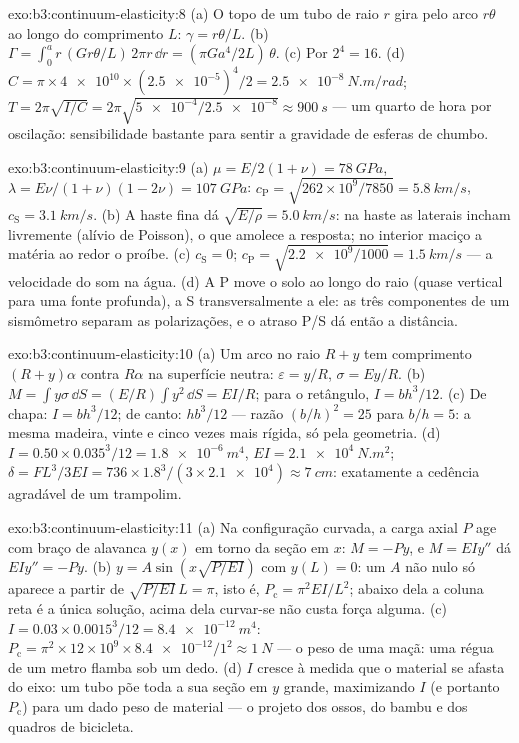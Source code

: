 \begin{solution}{exo:b3:continuum-elasticity:8}
(a) O topo de um tubo de raio $r$ gira pelo arco $r\theta$ ao longo do
comprimento $L$: $\gamma = r\theta/L$. (b) $\Gamma = \int_0^a r\,(G r\theta/L)\,
2\pi r\,\dd r = (\pi Ga^4/2L)\,\theta$. (c) Por $2^4 = 16$. (d) $C =
\pi \times \num{4e10} \times (\num{2.5e-5})^4/2 =
\qty{2.5e-8}{N.m/rad}$; $T = 2\pi\sqrt{I/C} = 2\pi\sqrt{\num{5e-4}/
\num{2.5e-8}} \approx \qty{900}{s}$ --- um quarto de hora por
oscilação: sensibilidade bastante para sentir a gravidade de esferas
de chumbo.
\end{solution}

\begin{solution}{exo:b3:continuum-elasticity:9}
(a) $\mu = E/2(1+\nu) = \qty{78}{GPa}$, $\lambda = E\nu/(1+\nu)(1-2\nu)
= \qty{107}{GPa}$: $c_{\text{P}} = \sqrt{262\times10^9/7850} =
\qty{5.8}{km/s}$, $c_{\text{S}} = \qty{3.1}{km/s}$. (b) A haste fina
dá $\sqrt{E/\rho} = \qty{5.0}{km/s}$: na haste as laterais incham
livremente (alívio de Poisson), o que amolece a resposta; no interior
maciço a matéria ao redor o proíbe. (c) $c_{\text{S}} = 0$;
$c_{\text{P}} = \sqrt{\num{2.2e9}/1000} = \qty{1.5}{km/s}$ --- a
velocidade do som na água. (d) A P move o solo ao longo do raio
(quase vertical para uma fonte profunda), a S transversalmente a ele:
as três componentes de um sismômetro separam as polarizações, e o
atraso P/S dá então a distância.
\end{solution}

\begin{solution}{exo:b3:continuum-elasticity:10}
(a) Um arco no raio $R + y$ tem comprimento $(R + y)\alpha$ contra
$R\alpha$ na superfície neutra: $\varepsilon = y/R$, $\sigma =
Ey/R$. (b) $M = \int y\sigma\,\dd S = (E/R)\int y^2\,\dd S = EI/R$;
para o retângulo, $I = bh^3/12$. (c) De chapa: $I = bh^3/12$; de
canto: $hb^3/12$ --- razão $(b/h)^2 = 25$ para $b/h = 5$: a mesma
madeira, vinte e cinco vezes mais rígida, só pela geometria. (d) $I = 0.50 \times
0.035^3/12 = \qty{1.8e-6}{m^4}$, $EI = \qty{2.1e4}{N.m^2}$; $\delta =
FL^3/3EI = 736 \times 1.8^3/(3 \times \num{2.1e4}) \approx
\qty{7}{cm}$: exatamente a cedência agradável de um trampolim.
\end{solution}

\begin{solution}{exo:b3:continuum-elasticity:11}
(a) Na configuração curvada, a carga axial $P$ age com braço de
alavanca $y(x)$ em torno da seção em $x$: $M = -Py$, e $M = EIy''$ dá
$EIy'' = -Py$. (b) $y = A\sin(x\sqrt{P/EI})$ com $y(L) = 0$: um $A$
não nulo só aparece a partir de $\sqrt{P/EI}\,L = \pi$, isto é, $P_{\text{c}} =
\pi^2EI/L^2$; abaixo dela a coluna reta é a única solução, acima dela
curvar-se não custa força alguma. (c) $I = 0.03 \times 0.0015^3/12 =
\qty{8.4e-12}{m^4}$: $P_{\text{c}} = \pi^2 \times 12\times10^9 \times
\num{8.4e-12}/1^2 \approx \qty{1}{N}$ --- o peso de uma maçã: uma
régua de um metro flamba sob um dedo. (d) $I$ cresce à medida que o
material se afasta do eixo: um tubo põe toda a sua seção em $y$
grande, maximizando $I$ (e portanto $P_{\text{c}}$) para um dado peso
de material --- o projeto dos ossos, do bambu e dos quadros de
bicicleta.
\end{solution}

